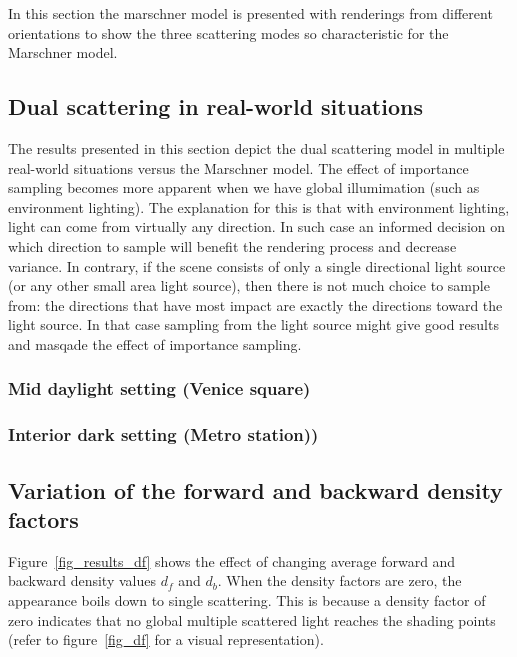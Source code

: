 \documentclass[11pt,a4paper]{report}
\begin{document}
In this section the marschner model is presented with renderings from different orientations to show the three scattering modes so characteristic for the Marschner model.

%
%

\subsection{Dual scattering in real-world situations}

The results presented in this section depict the dual scattering model in multiple real-world situations versus the Marschner model. The effect of importance sampling becomes more apparent when we have global illumimation (such as environment lighting). The explanation for this is that with environment lighting, light can come from virtually any direction. In such case an informed decision on which direction to sample will benefit the rendering process and decrease variance. In contrary, if the scene consists of only a single directional light source (or any other small area light source), then there is not much choice to sample from: the directions that have most impact are exactly the directions toward the light source. In that case sampling from the light source might give good results and masqade the effect of importance sampling.

\subsubsection{Mid daylight setting (Venice square)}

%
%

\subsubsection{Interior dark setting (Metro station))}

%
%

\subsection{Variation of the forward and backward density factors}

Figure~\ref{fig_results_df} shows the effect of changing average forward and backward density values $d_f$ and $d_b$. When the density factors are zero, the appearance boils down to single scattering. This is because a density factor of zero indicates that no global multiple scattered light reaches the shading points (refer to figure~\ref{fig_df} for a visual representation).
\end{document}
